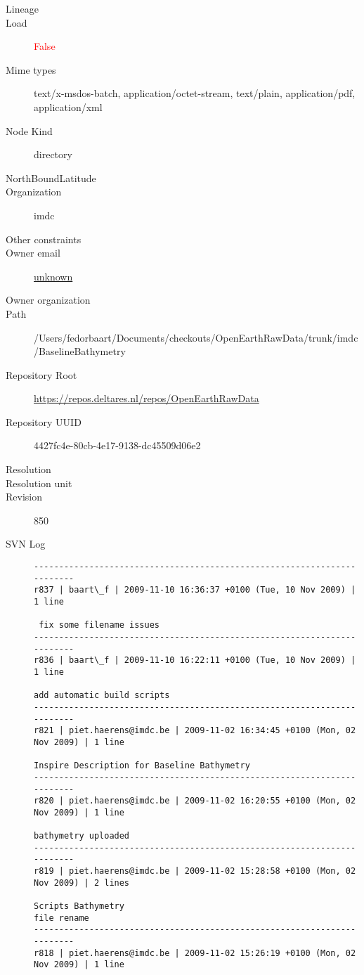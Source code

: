 \documentclass[9]{report}
\begin{document}
\begin{description}
  \item[Lineage] 
  \item[Load] \textcolor{red}{False}
  \item[Mime types] text/x-msdos-batch, application/octet-stream, text/plain, application/pdf, application/xml
  \item[Node Kind] directory
  \item[NorthBoundLatitude] 
  \item[Organization] imdc
  \item[Other constraints] 
  \item[Owner email] \href{mailto:unknown}{unknown}
  \item[Owner organization] 
  \item[Path] /Users/fedorbaart/Documents/checkouts/OpenEarthRawData/trunk/imdc/BaselineBathymetry
  \item[Repository Root] \href{https://repos.deltares.nl/repos/OpenEarthRawData}{https://repos.deltares.nl/repos/OpenEarthRawData}
  \item[Repository UUID] 4427fc4e-80cb-4e17-9138-dc45509d06e2
  \item[Resolution] 
  \item[Resolution unit] 
  \item[Revision] 850
  \item[SVN Log] \begin{verbatim}
------------------------------------------------------------------------
r837 | baart\_f | 2009-11-10 16:36:37 +0100 (Tue, 10 Nov 2009) | 1 line

 fix some filename issues
------------------------------------------------------------------------
r836 | baart\_f | 2009-11-10 16:22:11 +0100 (Tue, 10 Nov 2009) | 1 line

add automatic build scripts
------------------------------------------------------------------------
r821 | piet.haerens@imdc.be | 2009-11-02 16:34:45 +0100 (Mon, 02 Nov 2009) | 1 line

Inspire Description for Baseline Bathymetry
------------------------------------------------------------------------
r820 | piet.haerens@imdc.be | 2009-11-02 16:20:55 +0100 (Mon, 02 Nov 2009) | 1 line

bathymetry uploaded
------------------------------------------------------------------------
r819 | piet.haerens@imdc.be | 2009-11-02 15:28:58 +0100 (Mon, 02 Nov 2009) | 2 lines

Scripts Bathymetry
file rename
------------------------------------------------------------------------
r818 | piet.haerens@imdc.be | 2009-11-02 15:26:19 +0100 (Mon, 02 Nov 2009) | 1 line


\end{verbatim}
\end{description}
\end{document}
